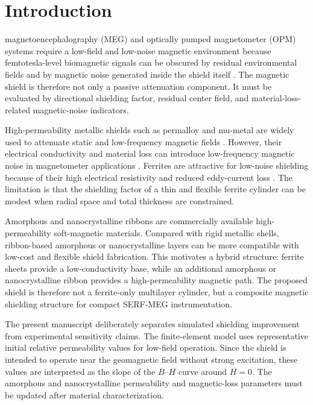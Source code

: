 \documentclass[letterpaper,journal]{IEEEtran}
\begin{document}
\section{Introduction}
 magnetoencephalography (MEG) and optically pumped magnetometer (OPM) systems require a low-field and low-noise magnetic environment because femtotesla-level biomagnetic signals can be obscured by residual environmental fields and by magnetic noise generated inside the shield itself \cite{ref1,ref2,ref3,ref4}. The magnetic shield is therefore not only a passive attenuation component. It must be evaluated by directional shielding factor, residual center field, and material-loss-related magnetic-noise indicators.

High-permeability metallic shields such as permalloy and mu-metal are widely used to attenuate static and low-frequency magnetic fields \cite{ref6,ref7,ref8}. However, their electrical conductivity and material loss can introduce low-frequency magnetic noise in magnetometer applications \cite{ref9,ref10,ref11}. Ferrites are attractive for low-noise shielding because of their high electrical resistivity and reduced eddy-current loss \cite{ref12,ref13,ref14,ref16}. The limitation is that the shielding factor of a thin and flexible ferrite cylinder can be modest when radial space and total thickness are constrained.

Amorphous and nanocrystalline ribbons are commercially available high-permeability soft-magnetic materials. Compared with rigid metallic shells, ribbon-based amorphous or nanocrystalline layers can be more compatible with low-cost and flexible shield fabrication. This motivates a hybrid structure: ferrite sheets provide a low-conductivity base, while an additional amorphous or nanocrystalline ribbon provides a high-permeability magnetic path. The proposed shield is therefore not a ferrite-only multilayer cylinder, but a composite magnetic shielding structure for compact SERF-MEG instrumentation.

The present manuscript deliberately separates simulated shielding improvement from experimental sensitivity claims. The finite-element model uses representative initial relative permeability values for low-field operation. Since the shield is intended to operate near the geomagnetic field without strong excitation, these values are interpreted as the slope of the $B$--$H$ curve around $H=0$. The amorphous and nanocrystalline permeability and magnetic-loss parameters must be updated after material characterization.
\end{document}
